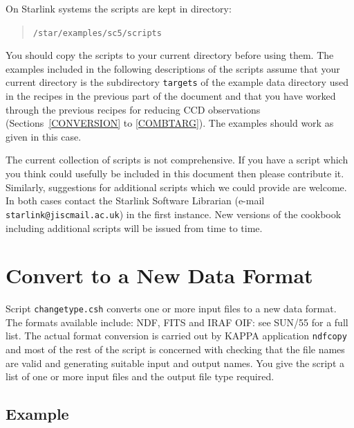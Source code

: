 \documentclass[twoside,11pt]{article}
\newcommand{\xref}[3]{#1}
\newcommand{\xlabel}[1]{}
\begin{document}
On Starlink systems the scripts are kept in directory:

\begin{quote}
{\tt /star/examples/sc5/scripts}
\end{quote}

You should copy the scripts to your current directory before using them.
The examples included in the following descriptions of the scripts
assume that your current directory is the subdirectory {\tt targets}
of the example data directory used in the recipes in the previous part
of the document and that you have worked through the previous recipes
for reducing CCD observations (Sections~\ref{CONVERSION} to \ref{COMBTARG}).
The examples should work as given in this case.

The current collection of scripts is not comprehensive.  If you have a
script which you think could usefully be included in this document then
please contribute it.  Similarly, suggestions for additional scripts which
we could provide are welcome.  In both cases contact the Starlink Software
Librarian (e-mail {\tt starlink@jiscmail.ac.uk}) in the first instance.  New
versions of the cookbook including additional scripts will be issued from
time to time.


\newpage
\section{\xlabel{CHANGETYPE}\label{CHANGETYPE}Convert to a New Data Format}

Script {\tt changetype.csh} converts one or more input files to a new
data format.  The formats available include: NDF, FITS and IRAF OIF:
see \xref{SUN/55}{sun55}{}\/\cite{SUN55} for a full list.  The actual
format conversion is carried out by \xref{KAPPA}{sun95}{} application
\xref{{\tt ndfcopy}}{sun95}{NDFCOPY} and most of the rest of the script is
concerned with checking that the file names are valid and generating
suitable input and output names.  You give the script a list of one or more
input files and the output file type required.

\subsection*{Example}
\end{document}
